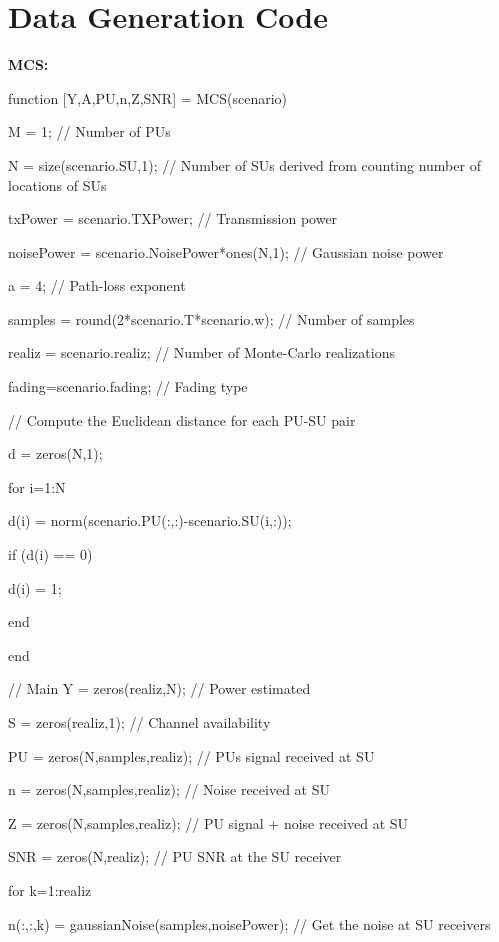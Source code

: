\chapter{Data Generation Code}

\textbf{MCS:}

function [Y,A,PU,n,Z,SNR] = MCS(scenario)

M = 1;                    // Number of PUs

N = size(scenario.SU,1);                 // Number of SUs derived from counting number of locations of SUs

txPower = scenario.TXPower;       // Transmission power

noisePower = scenario.NoisePower*ones(N,1); // Gaussian noise power

a = 4;                                      // Path-loss exponent

samples = round(2*scenario.T*scenario.w);   // Number of samples

realiz = scenario.realiz;                   // Number of Monte-Carlo realizations

fading=scenario.fading; 		// Fading type
    
// Compute the Euclidean distance for each PU-SU pair

d = zeros(N,1);

    for i=1:N

        d(i) = norm(scenario.PU(:,:)-scenario.SU(i,:));

        if (d(i) == 0)

            d(i) = 1;

        end

    end

// Main
Y = zeros(realiz,N);                        // Power estimated

S = zeros(realiz,1);                          // Channel availability

PU = zeros(N,samples,realiz);               // PUs signal received at SU

n = zeros(N,samples,realiz);                // Noise received at SU

Z = zeros(N,samples,realiz);                // PU signal + noise received at SU

SNR = zeros(N,realiz);                      // PU SNR at the SU receiver

for k=1:realiz

    n(:,:,k) = gaussianNoise(samples,noisePower);       // Get the noise at SU receivers

